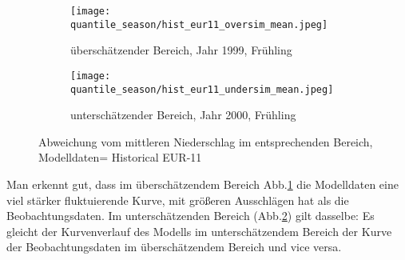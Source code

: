 \begin{figure}[h]
	\begin{subfigure}{0.49\textwidth}
		\texttt{[image: quantile\_season/hist\_eur11\_oversim\_mean.jpeg]}
		\caption{überschätzender Bereich, Jahr 1999, Frühling}
		\label{fig:seasons:hist_eur11:oversim_mean}
	\end{subfigure}
	\begin{subfigure}{0.49\textwidth}
		\texttt{[image: quantile\_season/hist\_eur11\_undersim\_mean.jpeg]}
		\caption{unterschätzender Bereich, Jahr 2000, Frühling}
		\label{fig:seasons:hist_eur11:undersim_mean}
	\end{subfigure}
	\caption{Abweichung vom mittleren Niederschlag im entsprechenden Bereich, Modelldaten= Historical EUR-11}
	\label{fig:seasons:hist_eur11:overundersim_mean}
\end{figure}
Man erkennt gut, dass im überschätzendem Bereich Abb.\ref{fig:seasons:hist_eur11:oversim_mean} die Modelldaten eine viel stärker fluktuierende Kurve, mit größeren Ausschlägen hat als die Beobachtungsdaten.
Im unterschätzenden Bereich (Abb.\ref{fig:seasons:hist_eur11:undersim_mean}) gilt dasselbe: Es gleicht der Kurvenverlauf des Modells im unterschätzendem Bereich der Kurve der Beobachtungsdaten im überschätzendem Bereich und vice versa.\newpage

